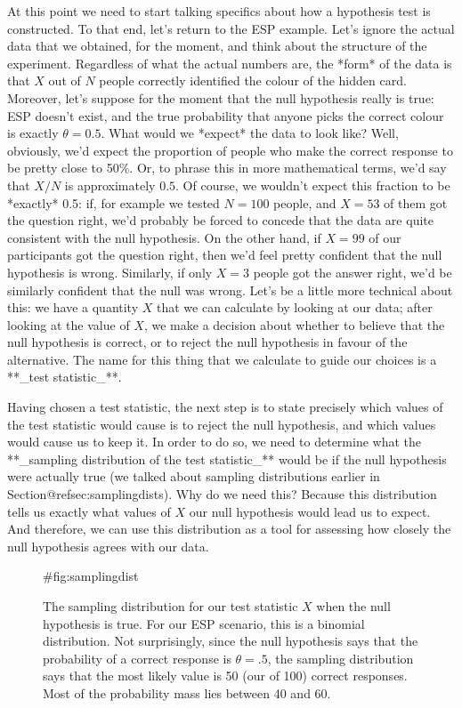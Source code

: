At this point we need to start talking specifics about how a hypothesis test is constructed. To that end, let's return to the ESP example. Let's ignore the actual data that we obtained, for the moment, and think about the structure of the experiment. Regardless of what the actual numbers are, the *form* of the data is that $X$ out of $N$ people correctly identified the colour of the hidden card. Moreover, let's suppose for the moment that the null hypothesis really is true: ESP doesn't exist, and the true probability that anyone picks the correct colour is exactly $\theta = 0.5$. What would we *expect* the data to look like? Well, obviously, we'd expect the proportion of people who make the correct response to be pretty close to 50\%. Or, to phrase this in more mathematical terms, we'd say that $X/N$ is approximately $0.5$. Of course, we wouldn't expect this fraction to be *exactly* 0.5: if, for example we tested $N=100$ people, and $X = 53$ of them got the question right, we'd probably be forced to concede that the data are quite consistent with the null hypothesis. On the other hand, if $X = 99$ of our participants got the question right, then we'd feel pretty confident that the null hypothesis is wrong. Similarly, if only $X=3$ people got the answer right, we'd be similarly confident that the null was wrong. Let's be a little more technical about this: we have a quantity $X$ that we can calculate by looking at our data; after looking at the value of $X$, we make a decision about whether to believe that the null hypothesis is correct, or to reject the null hypothesis in favour of the alternative. The name for this thing that we calculate to guide our choices is a **_test statistic_**. 


Having chosen a test statistic, the next step is to state precisely which values of the test statistic would cause is to reject the null hypothesis, and which values would cause us to keep it. In order to do so, we need to determine what the **_sampling distribution of the test statistic_** would be if the null hypothesis were actually true (we talked about sampling distributions earlier in Section@refsec:samplingdists). Why do we need this? Because this distribution tells us exactly what values of $X$ our null hypothesis would lead us to expect. And therefore, we can use this distribution as a tool for assessing how closely the null hypothesis agrees with our data. 

\begin{figure}[t]
\begin{center}
\caption{The sampling distribution for our test statistic $X$ when the null hypothesis is true. For our ESP scenario, this is a binomial distribution. Not surprisingly, since the null hypothesis says that the probability of a correct response is $\theta = .5$, the sampling distribution says that the most likely value is 50 (our of 100) correct responses. Most of the probability mass lies between 40 and 60.}
\HR
{#fig:samplingdist}
\end{center}
\end{figure}

